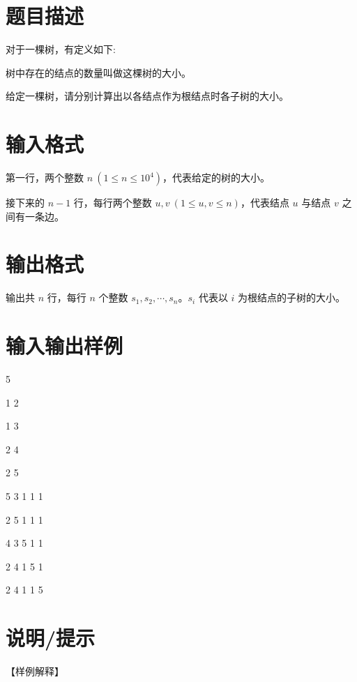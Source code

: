 \documentclass{ctpro}
\begin{document}
\makeproblem
\section*{题目描述}
对于一棵树，有定义如下:

\begin{definition}[树的大小]
	树中存在的结点的数量叫做这棵树的大小。
\end{definition}

给定一棵树，请分别计算出以各结点作为根结点时各子树的大小。

\section*{输入格式}
第一行，两个整数 $n~(1 \leq n \leq 10^4)$，代表给定的树的大小。

接下来的 $n-1$ 行，每行两个整数 $u,v~(1 \leq u,v \leq n)$，代表结点 $u$ 与结点 $v$ 之间有一条边。

\section*{输出格式}
输出共 $n$ 行，每行 $n$ 个整数 $s_1,s_2,\cdots,s_n$。$s_i$ 代表以 $i$ 为根结点的子树的大小。

\section*{输入输出样例}
\testcasetab
{
	5\par
	1 2\par
	1 3\par
	2 4\par
	2 5
}
{
	5 3 1 1 1\par
	2 5 1 1 1\par
	4 3 5 1 1\par
	2 4 1 5 1\par
	2 4 1 1 5
}

\section*{说明/提示}
【样例解释】
\end{document}
